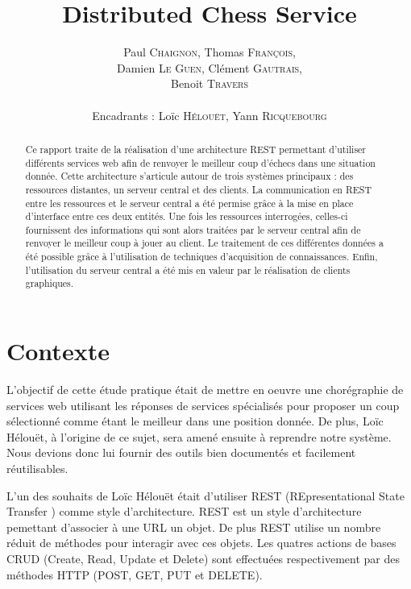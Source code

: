 \documentclass[a4paper,11pt]{article}
\title{ \textbf{Distributed Chess Service} }
\author{Paul \textsc{Chaignon}, Thomas \textsc{François}, \\
        Damien \textsc{Le Guen}, Clément \textsc{Gautrais}, \\
				Benoit \textsc{Travers} \\
        \\
        Encadrants : Loïc \textsc{Hélouët}, Yann \textsc{Ricquebourg}}
\date{}                    %
\begin{document}
          

\maketitle                 %
\thispagestyle{empty}      %



\begin{abstract}
Ce rapport traite de la réalisation d'une architecture REST permettant d'utiliser différents services web afin de renvoyer le meilleur coup d'échecs dans une situation donnée. Cette architecture s'articule autour de trois systèmes principaux : des ressources distantes, un serveur central et des clients. La communication en REST entre les ressources et le serveur central a été permise grâce à la mise en place d'interface entre ces deux entités. Une fois les ressources interrogées, celles-ci fournissent des informations qui sont alors traitées par le serveur central afin de renvoyer le meilleur coup à jouer au client. Le traitement de ces différentes données a été possible grâce à l'utilisation de techniques d'acquisition de connaissances. Enfin, l'utilisation du serveur central a été mis en valeur par le réalisation de clients graphiques.
\end{abstract} 


\section{Contexte}  
L'objectif de cette étude pratique était de mettre en oeuvre une chorégraphie de services web utilisant les réponses de services spécialisés pour proposer un coup sélectionné comme étant le meilleur dans une position donnée. De plus, Loïc Hélouët, à l'origine de ce sujet, sera amené ensuite à reprendre notre système. Nous devions donc lui fournir des outils bien documentés et facilement réutilisables.

L'un des souhaits de Loïc Hélouët était d'utiliser REST (REpresentational State Transfer \cite{rest-fielding}) comme style d'architecture. REST est un style d'architecture pemettant d'associer à une URL un objet. De plus REST utilise un nombre réduit de méthodes pour interagir avec ces objets. Les quatres actions de bases CRUD (Create, Read, Update et Delete) sont effectuées respectivement par des méthodes HTTP (POST, GET, PUT et DELETE).
\end{document}
